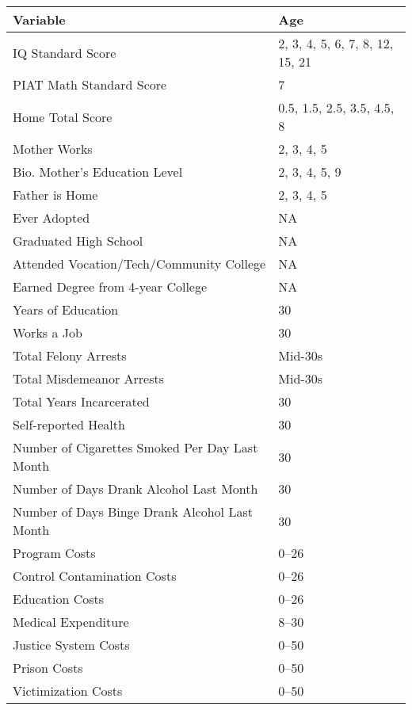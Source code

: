 \begin{tabular}{l l}
\toprule
Variable	&	Age	\\
\midrule			
IQ Standard Score	&	2, 3, 4, 5, 6, 7, 8, 12, 15, 21	\\
PIAT Math Standard Score	&	7	\\
Home Total Score	&	0.5, 1.5, 2.5, 3.5, 4.5, 8	\\
Mother Works	&	2, 3, 4, 5	\\
Bio. Mother's Education Level	&	2, 3, 4, 5, 9	\\
Father is Home	&	2, 3, 4, 5	\\
Ever Adopted	&		NA \\
Graduated High School	&	NA	\\
Attended Vocation/Tech/Community College	&	NA	\\
Earned Degree from 4-year College	&	NA	\\
Years of Education	&	30	\\
Works a Job	&	30	\\
Total Felony Arrests	&	Mid-30s	\\
Total Misdemeanor Arrests	&	Mid-30s	\\
Total Years Incarcerated	&	30	\\
Self-reported Health	&	30	\\
Number of Cigarettes Smoked Per Day Last Month	&	30	\\
Number of Days Drank Alcohol Last Month	&	30	\\
Number of Days Binge Drank Alcohol Last Month	&	30	\\
Program Costs	&	0--26	\\
Control Contamination Costs	&	0--26	\\
Education Costs	&	0--26	\\
Medical Expenditure &	8--30	\\
Justice System Costs	&	0--50	\\
Prison Costs	&	0--50	\\
Victimization Costs	&	0--50	\\
\bottomrule			
\end{tabular}